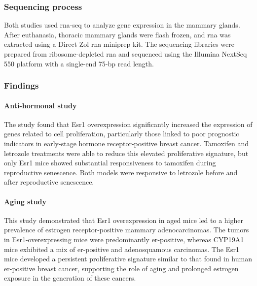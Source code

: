 \subsubsection{Sequencing process}
\label{sec:dataset_sequencing}
Both studies used \gls{rna-seq} to analyze gene expression in the mammary
glands.
After euthanasia, thoracic mammary glands were flash frozen, and \gls{rna} was
extracted using a Direct Zol \gls{rna} miniprep kit.
The sequencing libraries were prepared from ribosome-depleted \gls{rna} and sequenced
using the Illumina NextSeq 550 platform with a single-end 75-bp read
length\supercite{furth_esr1_2023,furth_overexpression_2023}.

\subsubsection{Findings}

\paragraph{Anti-hormonal study}
The study found that Esr1 overexpression significantly increased the expression
of genes related to cell proliferation, particularly those linked to poor
prognostic indicators in early-stage hormone receptor-positive breast cancer.
Tamoxifen and letrozole treatments were able to reduce this elevated
proliferative signature, but only Esr1 mice showed substantial responsiveness
to tamoxifen during reproductive senescence.
Both models were responsive to letrozole before and after reproductive
senescence\supercite{furth_esr1_2023}.

\paragraph{Aging study}
This study demonstrated that Esr1 overexpression in aged mice led to a higher
prevalence of estrogen receptor-positive mammary adenocarcinomas.
The tumors in Esr1-overexpressing mice were predominantly \gls{er}-positive, whereas
CYP19A1 mice exhibited a mix of \gls{er}-positive and adenosquamous carcinomas.
The Esr1 mice developed a persistent proliferative signature similar to that
found in human \gls{er}-positive breast cancer, supporting the role of aging and
prolonged estrogen exposure in the generation of these
cancers\supercite{furth_overexpression_2023}.
